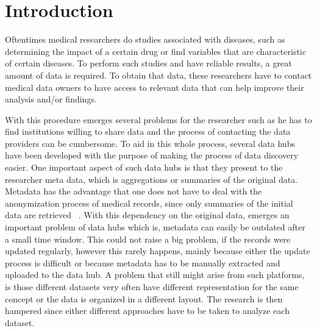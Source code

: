 \chapter{Introduction}
\label{chapter:introduction}

Oftentimes medical researchers do studies associated with diseases, such as determining the impact of a certain drug or find variables that are characteristic of certain diseases.
To perform such studies and have reliable results, a great amount of data is required.
To obtain that data, these researchers have to contact medical data owners to have access to relevant data that can help improve their analysis and/or findings.

With this procedure emerges several problems for the researcher such as he has to find
institutions willing to share data and the process of contacting the data providers can
be cumbersome.
To aid in this whole process, several data hubs have been developed with the purpose of
making the process of data discovery easier.
One important aspect of such data hubs is that they present to the researcher meta
data, which is aggregations or summaries of the original data.
Metadata has the advantage that one does not have to deal with the anonymization process
of medical records, since only summaries of the initial data are retrieved
~\cite{egenvar, montra}.
With this dependency on the original data, emerges an important problem of data hubs
which is, metadata can easily be outdated after a small time window.
This could not raise a big problem, if the records were updated regularly, however this
rarely happens, mainly because either the update process is difficult or because
metadata has to be manually extracted and uploaded to the data hub.
A problem that still might arise from such platforms, is those different datasets very
often have different representation for the same concept or the data is organized in a
different layout.
The research is then hampered since either different approaches have to be taken to
analyze each dataset.

